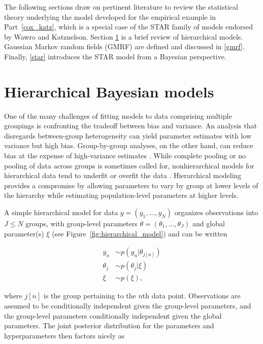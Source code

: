 The following sections draw on pertinent literature to review the statistical theory underlying 
the model developed for the empirical example in Part~\ref{cox_katz}, which is a special case 
of the STAR family of models endorsed by Wawro and Katznelson. Section \ref{hierarchical} 
is a brief review of hierarchical models. Gaussian Markov random fields (GMRF) are defined 
and discussed in \ref{gmrf}. Finally, \ref{star} introduces the STAR model from a Bayesian perspective. 



\section{Hierarchical Bayesian models}
\label{hierarchical}

One of the many challenges of fitting models to data comprising multiple groupings is 
confronting the tradeoff between bias and variance. An analysis that disregards between-group 
heterogeneity can yield parameter estimates with low variance but high bias. Group-by-group 
analyses, on the other hand, can reduce bias at the expense of high-variance estimates . While complete pooling or no pooling of data across 
groups is sometimes called for, nonhierarchical models for hierarchical data tend to underfit 
or overfit the data . Hierarchical modeling provides a 
compromise by allowing parameters to vary by group at lower levels of the hierarchy while 
estimating population-level parameters at higher levels. 

A simple hierarchical model for data $y = (y_1, \dots, y_N)$ organizes observations into $J \leq N$ 
groups, with group-level parameters $\theta = (\theta_1, \dots, \theta_J)$ and global parameter(s) $\xi$ 
(see Figure~\ref{fig:hierarchical_model}) and can be written

\begin{align*}
y_n &\sim p(y_n | \theta_{j[n]}) \\
\theta_j &\sim p(\theta_j | \xi) \\
\xi &\sim p(\xi),
\end{align*}

\noindent where $j[n]$ is the group pertaining to the $n$th data point. Observations are assumed 
to be conditionally independent given the group-level parameters, and the group-level parameters 
conditionally independent given the global parameters. The joint posterior distribution for the 
parameters and hyperparameters then factors nicely as

